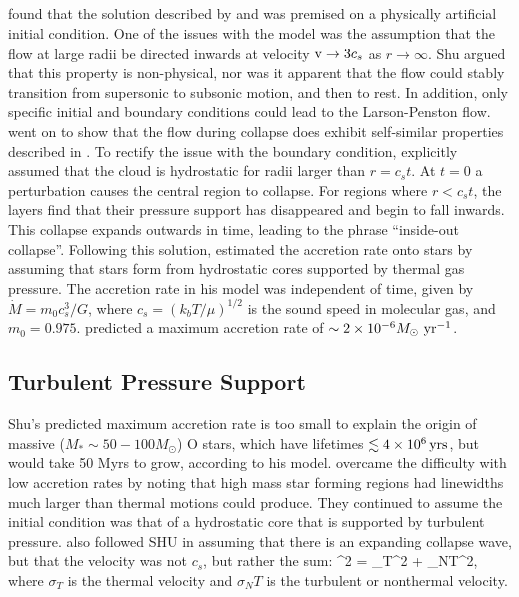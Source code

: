 \documentclass[../dissertation.tex]{subfiles}
\begin{document}
\subsection{\citet{1977ApJ...214..488S}} \label{subsec:Shu_review}
\citet{1977ApJ...214..488S} found that the solution described by \citet{1969MNRAS.145..271L} and \citet{1969MNRAS.144..425P} was premised on a physically artificial initial condition.
One of the issues with the model was the assumption that the flow at large radii be directed inwards at velocity ${\rm v} \rightarrow 3c_s$ as $r \rightarrow \infty$. 
Shu argued that this property is non-physical, nor was it apparent that the flow could stably transition from supersonic to subsonic motion, and then to rest. 
In addition, only specific initial and boundary conditions could lead to the Larson-Penston flow.
\citet{1977ApJ...214..488S} went on to show that the flow during collapse does exhibit self-similar properties described in \citet{1969MNRAS.145..271L}.
To rectify the issue with the boundary condition, \citet{1977ApJ...214..488S} explicitly assumed that the cloud is hydrostatic for radii larger than $r = c_s t$. 
At $t=0$ a perturbation causes the central region to collapse. 
For regions where $r < c_s t$, the layers find that their pressure support has disappeared and begin to fall inwards. 
This collapse expands outwards in time, leading to the phrase ``inside-out collapse''. 
Following this solution, \citet{1977ApJ...214..488S} estimated the accretion rate onto 
stars by assuming that stars form from hydrostatic cores supported by thermal gas pressure. 
The accretion rate in his model was independent of time, given by $\dot{M} = m_0c_s^3/G$, where $c_s = (k_b T / \mu)^{1/2}$  is the sound
speed in molecular gas, and $m_0 = 0.975$. 
\citet{1977ApJ...214..488S} predicted a maximum accretion rate of $\sim 2\times10^{-6} M_\odot\,\,\rm yr^{-1}$.

\subsection{Turbulent Pressure Support}
Shu's predicted maximum  accretion rate is too small to explain the origin of massive ($M_*\sim50-100M_\odot$) O stars, which have lifetimes $\lesssim 4\times10^6\,\rm yrs$, but would take 50 Myrs to grow, according to his model.
\citet{1992ApJ...396..631M}  overcame the difficulty with low accretion rates by noting that high mass star forming regions had linewidths much larger than thermal motions could produce. 
They continued to assume the initial condition was that of a hydrostatic core that is supported by turbulent pressure. 
\citet{1992ApJ...396..631M} also followed SHU in assuming that there is an expanding collapse wave, but that the velocity was not $c_s$, but rather the sum: 
%
\be
\sigma^2 = \sigma_T^2 + \sigma_{NT}^2, 
\ee
%
where $\sigma_T$ is the thermal velocity and $\sigma_NT$ is the turbulent or nonthermal velocity. 
\end{document}
